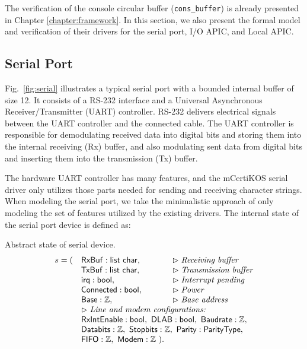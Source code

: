 The verification of the console circular buffer (\texttt{cons\_buffer}) is
already presented in Chapter \ref{chapter:framework}. In this section, we also present
the formal model and verification of their drivers for the serial port, I/O
APIC, and Local APIC.

\subsection{Serial Port}

Fig.~\ref{fig:serial} illustrates a typical serial port with a bounded internal
buffer of size 12. It consists of a RS-232 interface and a Universal
Asynchronous Receiver/Transmitter (UART) controller. RS-232 delivers electrical
signals between the UART controller and the connected cable. The UART controller
is responsible for demodulating received data into digital bits and storing them
into the internal receiving (Rx) buffer, and also modulating sent data from
digital bits and inserting them into the transmission (Tx) buffer.

The hardware UART controller has many features, and the mCertiKOS serial driver
only utilizes those parts needed for sending and receiving character strings.
When modeling the serial port, we take the minimalistic approach of only
modeling the set of features utilized by the existing drivers. The internal
state of the serial port device is defined as:

\begin{definition} \label{def:serial-device}
	Abstract state of serial device.
\[
\begin{array}{lll}
s = ( & \mathsf{RxBuf}: \mathsf{list} ~ \mathsf{char}, & \vartriangleright \textit{Receiving buffer} \\
 & \mathsf{TxBuf}: \mathsf{list} ~ \mathsf{char}, & \vartriangleright \textit{Transmission buffer} \\
 & \mathsf{irq}: \mathsf{bool}, & \vartriangleright \textit{Interrupt pending} \\
 & \mathsf{Connected}: \mathsf{bool}, & \vartriangleright \textit{Power} \\
 & \mathsf{Base}: \mathbb{Z}, & \vartriangleright \textit{Base address} \\
 & \multicolumn{2}{l} {\vartriangleright \textit{Line and modem configurations:}} \\
 & \multicolumn{2}{l}{\mathsf{RxIntEnable}: \mathsf{bool}, ~ \mathsf{DLAB}: \mathsf{bool}, ~ \mathsf{Baudrate}: \mathbb{Z},} \\
 & \multicolumn{2}{l}{\mathsf{Databits}: \mathbb{Z}, ~ \mathsf{Stopbits}: \mathbb{Z}, ~ \mathsf{Parity}: \mathsf{ParityType},} \\
 & \mathsf{FIFO}: \mathbb{Z}, ~ \mathsf{Modem}: \mathbb{Z} ~). \\
\end{array}
\]
\end{definition}
		
